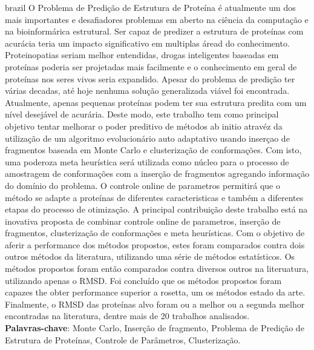 
\begin{resumo}[Resumo]
  \begin{otherlanguage*}{brazil}
    O Problema de Predição de Estrutura de Proteína é atualmente um dos mais
    importantes e desafiadores problemas em aberto na ciência da computação e
    na bioinformárica estrutural. Ser capaz de predizer a estrutura de proteínas
    com acurácia teria um impacto significativo em multiplas áread do
    conhecimento. Proteinopatias seriam melhor entendidas, drogas inteligentes
    baseadas em proteínas poderia ser projetadas mais facilmente e o
    conhecimento em geral de proteínas nos seres vivos seria expandido.
    Apesar do problema de predição ter várias decadas, até hoje nenhuma solução
    generalizada viável foi encontrada. Atualmente, apenas pequenas proteínas
    podem ter sua estrutura predita com um nível desejável de acurária. Deste
    modo, este trabalho tem como principal objetivo tentar melhorar o poder
    preditivo de métodos ab initio atravéz da utilização de um algoritmo
    evolucionário auto adaptativo usando inserçao de fragmentos baseada em
    Monte Carlo e clusterização de conformações. Com isto, uma poderoza meta
    heurística será utilizada como núcleo para o processo de amostragem de
    conformações com a inserção de fragmentos agregando informação do domínio do
    problema. O controle online de parametros permitirá que o método se adapte a
    proteínas de diferentes caracteristicas e também a diferentes etapas do
    processo de otimização. A principal contribuição deste trabalho está na
    inovativa proposta de combinar controle online de parametros, inserção de
    fragmentos, clusterização de conformações e meta heurísticas. Com o objetivo
    de aferir a performance dos métodos propostos, estes foram comparados contra
    dois outros métodos da literatura, utilizando uma série de métodos
    estatísticos. Os métodos propostos foram então comparados contra diversos
    outros na literuatura, utilizando apenas o RMSD. Foi concluído que os
    métodos propostos foram capazes the obter performance superior a rosetta, um
    os métodos estado da arte. Finalmente, o RMSD das proteínas alvo foram ou
    a melhor ou a segunda melhor encontradas na literatura, dentre mais de 20
    trabalhos analisados.
    \\
    \vspace{\onelineskip}
    \noindent
    \textbf{Palavras-chave}: Monte Carlo, Inserção de fragmento, Problema de Predição de Estrutura de Proteínas, Controle de Parâmetros, Clusterização.
  \end{otherlanguage*}
\end{resumo}

\listoffigures*
\cleardoublepage

\listoftables*
\cleardoublepage
